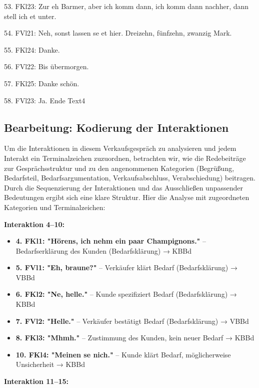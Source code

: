 \documentclass[
]{article}
\begin{document}
53. FKl23: Zur eh Barmer, aber ich komm dann, ich komm dann nachher, dann stell ich et unter.

54. FVl21: Neh, sonst lassen se et hier. Dreizehn, fünfzehn, zwanzig Mark.

55. FKl24: Danke.

56. FVl22: Bis übermorgen.

57. FKl25: Danke schön.

58. FVl23: Ja. Ende Text4

\subsection{Bearbeitung: Kodierung der Interaktionen}\label{bearbeitung-kodierung-der-interaktionen}

Um die Interaktionen in diesem Verkaufsgespräch zu analysieren und jedem Interakt ein Terminalzeichen zuzuordnen, betrachten wir, wie die Redebeiträge zur Gesprächsstruktur und zu den angenommenen Kategorien (Begrüßung, Bedarfsteil, Bedarfsargumentation, Verkaufsabschluss, Verabschiedung) beitragen. Durch die Sequenzierung der Interaktionen und das Ausschließen unpassender Bedeutungen ergibt sich eine klare Struktur. Hier die Analyse mit zugeordneten Kategorien und Terminalzeichen:

\textbf{Interaktion 4--10:}

\begin{itemize}
\item
  \textbf{4. FKl1: "Hörens, ich nehm ein paar Champignons."} -- Bedarfserklärung des Kunden (Bedarfsklärung) → KBBd
\item
  \textbf{5. FVl1: "Eh, braune?"} -- Verkäufer klärt Bedarf (Bedarfsklärung) → VBBd
\item
  \textbf{6. FKl2: "Ne, helle."} -- Kunde spezifiziert Bedarf (Bedarfsklärung) → KBBd
\item
  \textbf{7. FVl2: "Helle."} -- Verkäufer bestätigt Bedarf (Bedarfsklärung) → VBBd
\item
  \textbf{8. FKl3: "Mhmh."} -- Zustimmung des Kunden, kein neuer Bedarf → KBBd
\item
  \textbf{10. FKl4: "Meinen se nich."} -- Kunde klärt Bedarf, möglicherweise Unsicherheit → KBBd
\end{itemize}

\textbf{Interaktion 11--15:}
\end{document}
